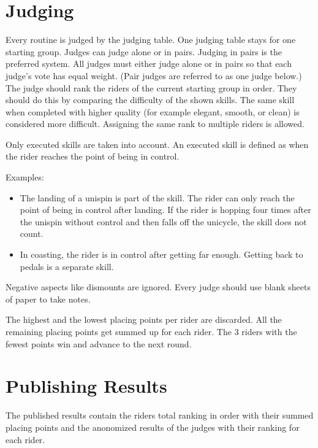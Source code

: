 \section{Judging}
Every routine is judged by the judging table.
One judging table stays for one starting group.
Judges can judge alone or in pairs.
Judging in pairs is the preferred system.
All judges must either judge alone or in pairs so that each judge's vote has equal weight.
(Pair judges are referred to as one judge below.)
The judge should rank the riders of the current starting group in order.
They should do this by comparing the difficulty of the shown skills.
The same skill when completed with higher quality (for example elegant, smooth, or clean) is considered more difficult.
Assigning the same rank to multiple riders is allowed.

Only executed skills are taken into account.
An executed skill is defined as when the rider reaches the point of being in control.

Examples:
\begin{itemize}
\item The landing of a unispin is part of the skill.
The rider can only reach the point of being in control after landing.
If the rider is hopping four times after the unispin without control and then falls off the unicycle, the skill does not count.
\item In coasting, the rider is in control after getting far enough.
Getting back to pedals is a separate skill.
\end{itemize}

Negative aspects like dismounts are ignored.
Every judge should use blank sheets of paper to take notes.

The highest and the lowest placing points per rider are discarded.
All the remaining placing points get summed up for each rider.
The 3 riders with the fewest points win and advance to the next round.

\section{Publishing Results}
The published results contain the riders total ranking in order with their summed placing points and the anonomized results of the judges with their ranking for each rider.
